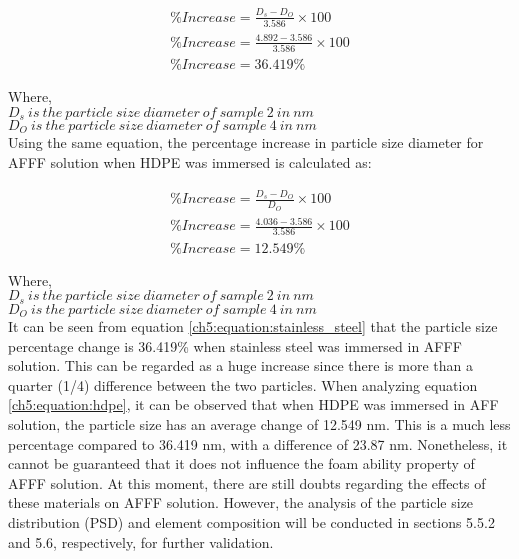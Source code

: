 \begin{gather}
    \%Increase = \frac{D_s - D_O}{3.586} \times 100 \\ 
    \nonumber \%Increase = \frac{4.892 - 3.586}{3.586}\times 100 \\
    \nonumber \%Increase = 36.419\%
    \label{ch5:equation:stainless_steel}
\end{gather}

Where, \\
$D_s\ is\ the\ particle\ size\ diameter\ of\ sample\ 2\ in\ nm$ \\
$D_O\ is\ the\ particle\ size\ diameter\ of\ sample\ 4\ in\ nm$ \\

Using the same equation, the percentage increase in particle size diameter for AFFF solution when HDPE was immersed is calculated as:  

\begin{gather}
    \%Increase = \frac{D_s - D_O}{D_O} \times 100 \\ 
    \nonumber \%Increase = \frac{4.036 - 3.586}{3.586}\times 100 \\
    \nonumber \%Increase = 12.549\% 
    \label{ch5:equation:hdpe}
\end{gather}
 
Where, \\
$D_s\ is\ the\ particle\ size\ diameter\ of\ sample\ 2\ in\ nm$ \\
$D_O\ is\ the\ particle\ size\ diameter\ of\ sample\ 4\ in\ nm$ \\

It can be seen from equation \ref{ch5:equation:stainless_steel} that the particle size percentage change is 36.419\% when stainless steel was immersed in AFFF solution. This can be regarded as a huge increase since there is more than a quarter (1/4) difference between the two particles. When analyzing equation \ref{ch5:equation:hdpe}, it can be observed that when HDPE was immersed in AFF solution, the particle size has an average change of 12.549 nm. This is a much less percentage compared to 36.419 nm, with a difference of 23.87 nm. Nonetheless, it cannot be guaranteed that it does not influence the foam ability property of AFFF solution.  At this moment, there are still doubts regarding the effects of these materials on AFFF solution. However, the analysis of the particle size distribution (PSD) and element composition will be conducted in sections 5.5.2 and 5.6, respectively, for further validation.

